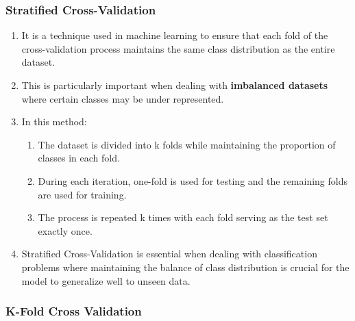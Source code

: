 \subsubsection{Stratified Cross-Validation}

\begin{enumerate}
    \item It is a technique used in machine learning to ensure that each fold of the cross-validation process maintains the same class distribution as the entire dataset.
    \hfill \cite{geeksforgeeks/machine-learning/cross-validation-machine-learning}

    \item This is particularly important when dealing with \textbf{imbalanced datasets} where certain classes may be under represented.
    \hfill \cite{geeksforgeeks/machine-learning/cross-validation-machine-learning}

    \item In this method:
    \begin{enumerate}
        \item The dataset is divided into k folds while maintaining the proportion of classes in each fold.
        \hfill \cite{geeksforgeeks/machine-learning/cross-validation-machine-learning}

        \item During each iteration, one-fold is used for testing and the remaining folds are used for training.
        \hfill \cite{geeksforgeeks/machine-learning/cross-validation-machine-learning}

        \item The process is repeated k times with each fold serving as the test set exactly once.
        \hfill \cite{geeksforgeeks/machine-learning/cross-validation-machine-learning}
    \end{enumerate}

    \item Stratified Cross-Validation is essential when dealing with classification problems where maintaining the balance of class distribution is crucial for the model to generalize well to unseen data.
    \hfill \cite{geeksforgeeks/machine-learning/cross-validation-machine-learning}
\end{enumerate}


\subsubsection{K-Fold Cross Validation }

